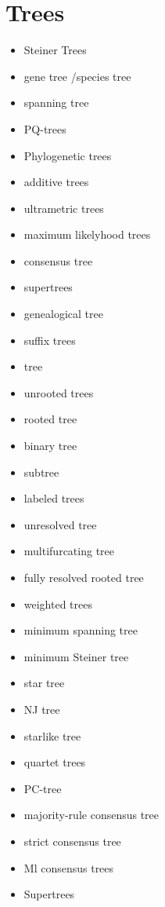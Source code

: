 \section{Trees}

\begin{itemize}
    \item Steiner Trees
    \item gene tree /species tree
    \item spanning tree
    \item PQ-trees
    \item Phylogenetic trees
    \item additive trees
    \item ultrametric trees
    \item maximum likelyhood trees
    \item consensus tree
    \item supertrees
    \item genealogical tree
    \item suffix trees
    \item tree
    \item unrooted trees
    \item rooted tree
    \item binary tree
    \item subtree
    \item labeled trees
    \item unresolved tree
    \item multifurcating tree 
    \item fully resolved rooted tree
    \item weighted trees
    \item minimum spanning tree
    \item minimum Steiner tree
    \item star tree
    \item NJ tree
    \item starlike tree
    \item quartet trees
    \item PC-tree
    \item majority-rule consensus tree
    \item strict consensus tree
    \item Ml consensus trees
    \item Supertrees
\end{itemize}